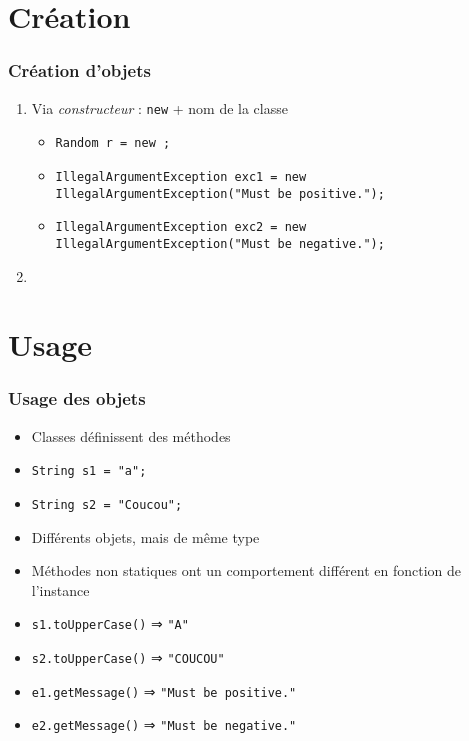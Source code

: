 \documentclass[english, french]{beamer}
\begin{document}
\section{Création}
\begin{frame}
	\frametitle{Création d’objets}
	\begin{enumerate}
		\item Via \emph{constructeur} : \texttt{new} + nom de la classe
		\begin{itemize}
			\item \texttt{Random r = new ;}
			\item \texttt{IllegalArgumentException exc1 = new IllegalArgumentException("Must be positive.");}
			\item \texttt{IllegalArgumentException exc2 = new IllegalArgumentException("Must be negative.");}
		\end{itemize}
		\item {}\onslide<2->{
			Via une méthode
			\begin{itemize}
				\item \texttt{Instant now = Instant.now();}%
				\item \texttt{String ten = String.valueOf(10);}
			\end{itemize}
			\item Via une variable statique: \texttt{DateTimeFormatter formatter = DateTimeFormatter.ISO\_DATE}
			\item Syntaxe particulière pour instances de \texttt{String} : \texttt{String s = "Coucou";}
		}
	\end{enumerate}
\end{frame}

\section{Usage}
\begin{frame}
	\frametitle{Usage des objets}
	\begin{itemize}
		\item Classes définissent des méthodes
		\item \texttt{String s1 = "a";}
		\item \texttt{String s2 = "Coucou";}
		\item Différents objets, mais de même type
		\item Méthodes non statiques ont un comportement différent en fonction de l’instance
		\item \texttt{s1.toUpperCase()} ⇒ \texttt{"A"}
		\item \texttt{s2.toUpperCase()} ⇒ \texttt{"COUCOU"}
		\item \texttt{e1.getMessage()} ⇒ \texttt{"Must be positive."}
		\item \texttt{e2.getMessage()} ⇒ \texttt{"Must be negative."}
	\end{itemize}
\end{frame}
\end{document}
